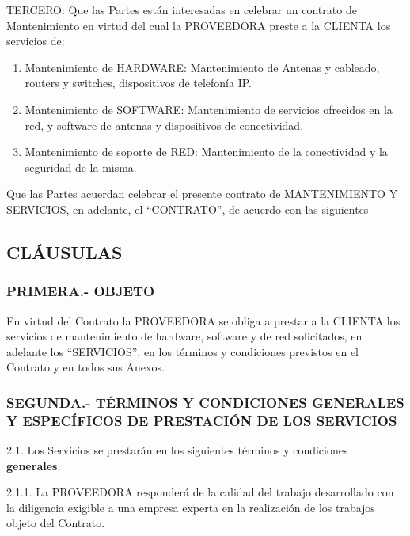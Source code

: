 \documentclass[11pt,spanish,a4paper,]{article}
\begin{document}
TERCERO: Que las Partes están interesadas en celebrar un contrato de
Mantenimiento en virtud del cual la PROVEEDORA preste a la CLIENTA los
servicios de:

\begin{enumerate}
\def\labelenumi{\alph{enumi})}
\itemsep1pt\parskip0pt
\item
  Mantenimiento de HARDWARE: Mantenimiento de Antenas y cableado,
  routers y switches, dispositivos de telefonía IP.
\item
  Mantenimiento de SOFTWARE: Mantenimiento de servicios ofrecidos en la
  red, y software de antenas y dispositivos de conectividad.
\item
  Mantenimiento de soporte de RED: Mantenimiento de la conectividad y la
  seguridad de la misma.
\end{enumerate}

Que las Partes acuerdan celebrar el presente contrato de MANTENIMIENTO Y
SERVICIOS, en adelante, el ``CONTRATO'', de acuerdo con las siguientes

\subsection{CLÁUSULAS}\label{cluxe1usulas}

\subsubsection{PRIMERA.- OBJETO}\label{primera.--objeto}

En virtud del Contrato la PROVEEDORA se obliga a prestar a la CLIENTA
los servicios de mantenimiento de hardware, software y de red
solicitados, en adelante los ``SERVICIOS'', en los términos y
condiciones previstos en el Contrato y en todos sus Anexos.

\subsubsection{SEGUNDA.- TÉRMINOS Y CONDICIONES GENERALES Y ESPECÍFICOS
DE PRESTACIÓN DE LOS
SERVICIOS}\label{segunda.--tuxe9rminos-y-condiciones-generales-y-especuxedficos-de-prestaciuxf3n-de-los-servicios}

2.1. Los Servicios se prestarán en los siguientes términos y condiciones
\textbf{generales}:

2.1.1. La PROVEEDORA responderá de la calidad del trabajo desarrollado
con la diligencia exigible a una empresa experta en la realización de
los trabajos objeto del Contrato.
\end{document}
